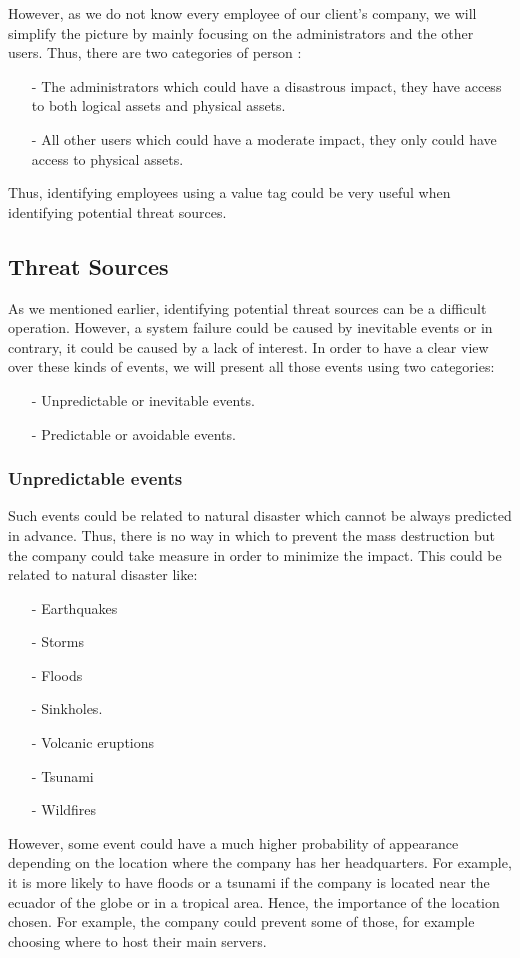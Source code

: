 \documentclass[a4paper,10pt]{article}
\begin{document}
However, as we do not know every employee of our client's company, we will simplify the picture by mainly focusing on the administrators and the other users. Thus, there are two categories of person :
\begin{enumerate}
\item[-] The administrators which could have a disastrous impact, they have access to both logical assets and physical assets.
\item[-] All other users which could have a moderate impact, they only could have access to physical assets.
\end{enumerate}
Thus, identifying employees using a value tag could be very useful when identifying potential threat sources.


\subsection{Threat Sources}

As we mentioned earlier, identifying potential threat sources can be a difficult operation. However, a system failure could be caused by inevitable events or in contrary, it could be caused by a lack of interest. In order to have a clear view over these kinds of events, we will present all those events using two categories:
\begin{enumerate}
\item[-] Unpredictable or inevitable events.
\item[-] Predictable or avoidable events.
\end{enumerate}

\subsubsection{Unpredictable events}
Such events could be related to natural disaster which cannot be always predicted in advance. Thus, there is no way in which to prevent the mass destruction but the company could take measure in order to minimize the impact. This could be related to natural disaster like:
\begin{enumerate}
\item[-] Earthquakes
\item[-] Storms
\item[-] Floods
\item[-] Sinkholes.
\item[-] Volcanic eruptions
\item[-] Tsunami
\item[-] Wildfires
\end{enumerate}
However, some event could have a much higher probability of appearance depending on the location where the company has her headquarters. For example, it is more likely to have floods or a tsunami if the company is located near the ecuador of the globe or in a tropical area. Hence, the importance of the location chosen. For example, the company could prevent some of those, for example choosing where to host their main servers.
\end{document}
